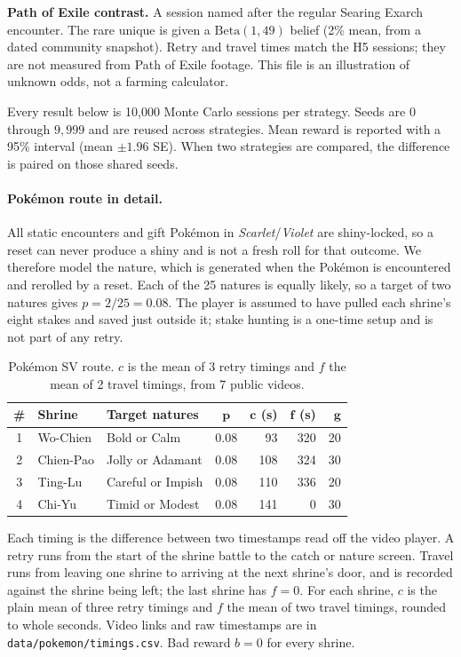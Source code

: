 \documentclass[11pt,a4paper]{article}
\begin{document}
\textbf{Path of Exile contrast.} A session named after the regular Searing Exarch encounter. The rare unique is given a $\mathrm{Beta}(1,49)$ belief (2\% mean, from a dated community snapshot). Retry and travel times match the H5 sessions; they are not measured from Path of Exile footage. This file is an illustration of unknown odds, not a farming calculator.

Every result below is 10,000 Monte Carlo sessions per strategy. Seeds are $0$ through $9{,}999$ and are reused across strategies. Mean reward is reported with a 95\% interval (mean $\pm 1.96$ SE). When two strategies are compared, the difference is paired on those shared seeds.

\paragraph{Pok\'emon route in detail.}
All static encounters and gift Pok\'emon in \emph{Scarlet}/\emph{Violet} are shiny-locked, so a reset can never produce a shiny and is not a fresh roll for that outcome. We therefore model the nature, which is generated when the Pok\'emon is encountered and rerolled by a reset. Each of the 25 natures is equally likely, so a target of two natures gives $p = 2/25 = 0.08$. The player is assumed to have pulled each shrine's eight stakes and saved just outside it; stake hunting is a one-time setup and is not part of any retry.

\begin{table}[H]
\centering
\caption{Pok\'emon SV route. $c$ is the mean of 3 retry timings and $f$ the mean of 2 travel timings, from 7 public videos.}
\label{tab:shrines}
\small
\begin{tabular}{@{}c l l c r r r@{}}
\toprule
\textbf{\#} & \textbf{Shrine} & \textbf{Target natures} & $\boldsymbol{p}$ & $\boldsymbol{c}$ \textbf{(s)} & $\boldsymbol{f}$ \textbf{(s)} & $\boldsymbol{g}$ \\
\midrule
1 & Wo-Chien  & Bold or Calm      & 0.08 &  93 & 320 & 20 \\
2 & Chien-Pao & Jolly or Adamant  & 0.08 & 108 & 324 & 30 \\
3 & Ting-Lu   & Careful or Impish & 0.08 & 110 & 336 & 20 \\
4 & Chi-Yu    & Timid or Modest   & 0.08 & 141 &   0 & 30 \\
\bottomrule
\end{tabular}
\end{table}

Each timing is the difference between two timestamps read off the video player. A retry runs from the start of the shrine battle to the catch or nature screen. Travel runs from leaving one shrine to arriving at the next shrine's door, and is recorded against the shrine being left; the last shrine has $f = 0$. For each shrine, $c$ is the plain mean of three retry timings and $f$ the mean of two travel timings, rounded to whole seconds. Video links and raw timestamps are in \texttt{data/pokemon/timings.csv}. Bad reward $b = 0$ for every shrine.
\end{document}
